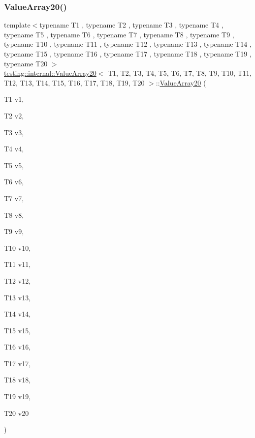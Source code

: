 \subsubsection{\texorpdfstring{ValueArray20()}{ValueArray20()}\hspace{0.1cm}{\footnotesize\ttfamily [1/2]}}
{\footnotesize\ttfamily template$<$typename T1 , typename T2 , typename T3 , typename T4 , typename T5 , typename T6 , typename T7 , typename T8 , typename T9 , typename T10 , typename T11 , typename T12 , typename T13 , typename T14 , typename T15 , typename T16 , typename T17 , typename T18 , typename T19 , typename T20 $>$ \\
\mbox{\hyperlink{classtesting_1_1internal_1_1ValueArray20}{testing\+::internal\+::\+Value\+Array20}}$<$ T1, T2, T3, T4, T5, T6, T7, T8, T9, T10, T11, T12, T13, T14, T15, T16, T17, T18, T19, T20 $>$\+::\mbox{\hyperlink{classtesting_1_1internal_1_1ValueArray20}{Value\+Array20}} (\begin{DoxyParamCaption}\item[{T1}]{v1,  }\item[{T2}]{v2,  }\item[{T3}]{v3,  }\item[{T4}]{v4,  }\item[{T5}]{v5,  }\item[{T6}]{v6,  }\item[{T7}]{v7,  }\item[{T8}]{v8,  }\item[{T9}]{v9,  }\item[{T10}]{v10,  }\item[{T11}]{v11,  }\item[{T12}]{v12,  }\item[{T13}]{v13,  }\item[{T14}]{v14,  }\item[{T15}]{v15,  }\item[{T16}]{v16,  }\item[{T17}]{v17,  }\item[{T18}]{v18,  }\item[{T19}]{v19,  }\item[{T20}]{v20 }\end{DoxyParamCaption})\hspace{0.3cm}{\ttfamily [inline]}}

\mbox{\label{classtesting_1_1internal_1_1ValueArray20_a965099028a2057212ba388b8017f8e68}} 
